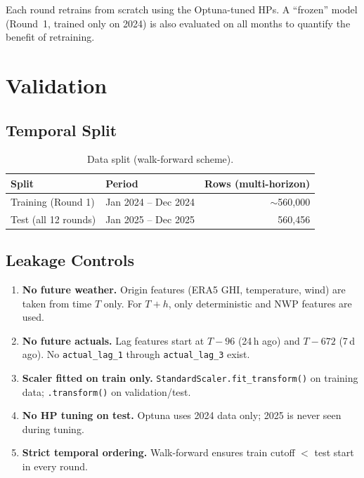 \documentclass[11pt,a4paper]{article}
\begin{document}
Each round retrains from scratch using the Optuna-tuned HPs.
A ``frozen'' model (Round~1, trained only on 2024) is also evaluated on all months to quantify the benefit of retraining.

\section{Validation}

\subsection{Temporal Split}

\begin{table}[H]
\centering
\caption{Data split (walk-forward scheme).}\label{tab:split}
\small
\begin{tabular}{@{}llr@{}}
\toprule
Split & Period & Rows (multi-horizon) \\
\midrule
Training (Round 1) & Jan 2024 -- Dec 2024 & ${\sim}$560{,}000 \\
Test (all 12 rounds) & Jan 2025 -- Dec 2025 & 560{,}456 \\
\bottomrule
\end{tabular}
\end{table}

\subsection{Leakage Controls}

\begin{enumerate}[nosep]
  \item \textbf{No future weather.} Origin features (ERA5 GHI, temperature, wind) are taken from time $T$ only.  For $T{+}h$, only deterministic and NWP features are used.
  \item \textbf{No future actuals.} Lag features start at $T{-}96$ (24\,h ago) and $T{-}672$ (7\,d ago). No \texttt{actual\_lag\_1} through \texttt{actual\_lag\_3} exist.
  \item \textbf{Scaler fitted on train only.} \texttt{StandardScaler.fit\_transform()} on training data; \texttt{.transform()} on validation/test.
  \item \textbf{No HP tuning on test.} Optuna uses 2024 data only; 2025 is never seen during tuning.
  \item \textbf{Strict temporal ordering.} Walk-forward ensures train cutoff $<$ test start in every round.
\end{enumerate}
\end{document}
